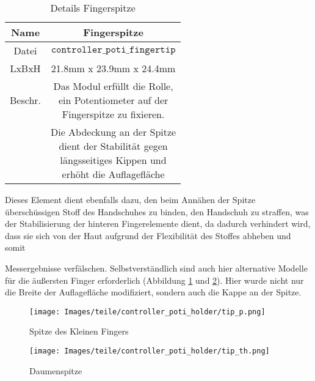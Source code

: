 \begin{minipage}{0.6\textwidth}
    \begin{table}[H]
        \centering
        \begin{tabular}{|c|c|}
            \hline
            Name&Fingerspitze\\
            \hline
            Datei&$\texttt{controller}\_ \texttt{poti}\_\texttt{fingertip}$\\
            \hline
            LxBxH&21.8mm x 23.9mm x 24.4mm\\
            \hline
            Beschr.&\shortstack{Das Modul erfüllt die Rolle,\\ein Potentiometer auf der\\Fingerspitze zu fixieren.}\\
            &\shortstack{Die Abdeckung an der Spitze\\dient der Stabilität gegen\\längsseitiges Kippen und\\erhöht die Auflagefläche}\\
            \hline
        \end{tabular} 
        \caption{Details Fingerspitze}
        \label{tab:test}
    \end{table}
    
\end{minipage}
\begin{minipage}{0.4\textwidth}
    Dieses Element dient ebenfalls dazu, den beim Annähen der Spitze überschüssigen Stoff des Handschuhes 
    zu binden, den Handschuh zu straffen, was der Stabilisierung der hinteren Fingerelemente dient, da 
    dadurch verhindert wird, dass sie sich von der Haut aufgrund der Flexibilität des Stoffes abheben und somit 
\end{minipage}

\vspace{3mm}

Messergebnisse verfälschen. Selbstverständlich sind auch hier alternative Modelle für die äußersten Finger erforderlich (Abbildung \ref{tipp} und \ref{tipth}). Hier wurde nicht nur die Breite der Auflagefläche modifiziert, sondern auch die Kappe an der Spitze.

\begin{minipage}{0.5\textwidth}
    \begin{figure}[H]
        \texttt{[image: Images/teile/controller\_poti\_holder/tip\_p.png]}
        \centering
        \caption{Spitze des Kleinen Fingers}
        \label{tipp}
    \end{figure}
\end{minipage}
\begin{minipage}{0.5\textwidth}
    \begin{figure}[H]
        \texttt{[image: Images/teile/controller\_poti\_holder/tip\_th.png]}
        \centering
        \caption{Daumenspitze}
        \label{tipth}
    \end{figure}
\end{minipage}

